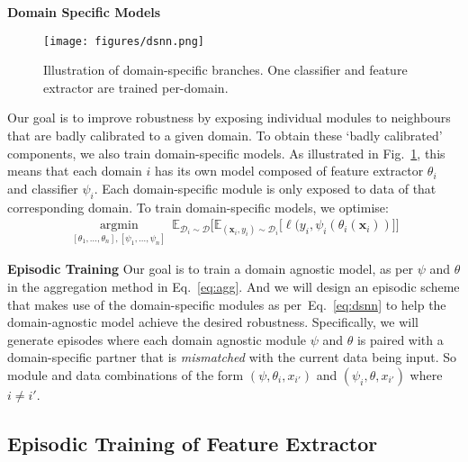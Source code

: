\documentclass[10pt,twocolumn,letterpaper]{article}
\newcommand{\keypoint}[1]{\vspace{0.1cm}\noindent\textbf{#1}\quad}
\begin{document}
\keypoint{Domain Specific Models}
\begin{figure}[t]
\centering
\texttt{[image: figures/dsnn.png]}
\vspace{-0.4cm}
\caption{\small Illustration of domain-specific branches. One classifier and feature extractor are trained per-domain.}
\label{fig-dsnn}
    \vspace{-0.3cm}
\end{figure}
Our goal is to improve robustness by exposing individual modules to neighbours that are badly calibrated to a given domain. To obtain these `badly calibrated' components, we also train domain-specific models. As illustrated in Fig.~\ref{fig-dsnn}, this means that each domain $i$ has its own model composed of feature extractor $\theta_i$ and classifier $\psi_i$. Each domain-specific module is only exposed to data of that corresponding domain. To train domain-specific models, we optimise:
\begin{equation}
\label{eq:dsnn}
\begin{aligned}
\underset{[\theta_1,\dots,\theta_n], [\psi_1,\dots,\psi_n]}{\operatorname{argmin}}~ \mathbb{E}_{\mathcal{D}_i\sim\mathcal{D}} \big[ \mathbb{E}_{(\mathbf{x}_i, y_i)\sim \mathcal{D}_i} \big[  \ell(y_i, \psi_i (\theta_i(\mathbf{x}_i)) \big] \big]
\end{aligned}
\end{equation}


\keypoint{Episodic Training}
Our goal is to train a domain agnostic model, as per $\psi$ and $\theta$  in the aggregation method in Eq.~\ref{eq:agg}. And we will design an episodic scheme that makes use of the domain-specific modules as per~Eq.~\ref{eq:dsnn} to help the domain-agnostic model achieve the desired robustness. Specifically, we will generate episodes where each domain agnostic module $\psi$ and $\theta$ is paired with a domain-specific partner that is \emph{mismatched} with the current data being input. So module and data combinations of the form $(\psi,\theta_i,x_{i'})$  and  $(\psi_i,\theta,x_{i'})$ where $i\neq i'$.




\subsection{Episodic Training of Feature Extractor\label{epsisodic-feat}}
\end{document}
